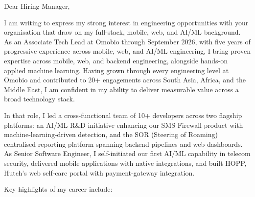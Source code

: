 \documentclass[11pt]{article}
\begin{document}

Dear Hiring Manager,

I am writing to express my strong interest in engineering opportunities with your organisation that draw on my full-stack, mobile, web, and AI/ML background. As an Associate Tech Lead at Omobio through September 2026, with five years of progressive experience across mobile, web, and AI/ML engineering, I bring proven expertise across mobile, web, and backend engineering, alongside hands-on applied machine learning. Having grown through every engineering level at Omobio and contributed to 20+ engagements across South Asia, Africa, and the Middle East, I am confident in my ability to deliver measurable value across a broad technology stack.

In that role, I led a cross-functional team of 10+ developers across two flagship platforms: an AI/ML R\&D initiative enhancing our SMS Firewall product with machine-learning-driven detection, and the SOR (Steering of Roaming) centralised reporting platform spanning backend pipelines and web dashboards. As Senior Software Engineer, I self-initiated our first AI/ML capability in telecom security, delivered mobile applications with native integrations, and built HOPP, Hutch's web self-care portal with payment-gateway integration.

Key highlights of my career include:

\begin{clitems}
  \item {}
  \item {}
  \item {}
  \item {}
\end{clitems}
\end{document}
